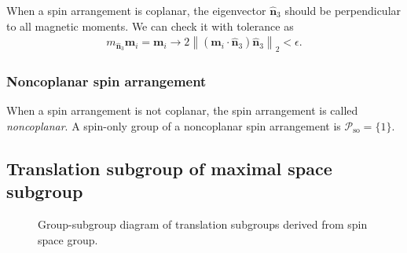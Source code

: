\documentclass[a4paper, 11pt]{article}
\theoremstyle{definition}
\newcommand{\term}[1]{\textit{#1}}
\newcommand{\norm}[1]{\left\lVert#1\right\rVert}
\begin{document}
When a spin arrangement is coplanar, the eigenvector $\hat{\bm{n}}_{3}$ should be perpendicular to all magnetic moments.
We can check it with tolerance as
\begin{align}
  m_{\hat{\bm{n}}_{3}} \bm{m}_{i} = \bm{m}_{i}
  \rightarrow
  2 \norm{ (\bm{m}_{i} \cdot \hat{\bm{n}}_{3}) \hat{\bm{n}}_{3}}_{2} < \epsilon.
\end{align}

\subsubsection{Noncoplanar spin arrangement}

When a spin arrangement is not coplanar, the spin arrangement is called \term{noncoplanar}.
A spin-only group of a noncoplanar spin arrangement is $\mathcal{P}_{\mathrm{so}} = \{ 1 \}$.

\subsection{Translation subgroup of maximal space subgroup}

\begin{figure}
  \centering
  \caption{\label{fig:translation_subgroup}Group-subgroup diagram of translation subgroups derived from spin space group.}
\end{figure}
\end{document}
